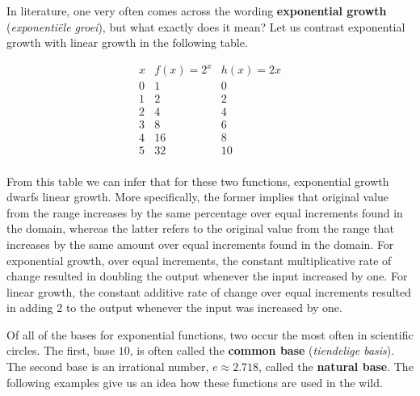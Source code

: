 In literature, one very often comes across the wording \textbf{exponential growth} (\textit{exponenti\"ele groei}), but what exactly does it mean? Let us contrast exponential growth with linear growth in the following table. 

\renewcommand{\arraystretch}{1.5}
\[ \begin{array}{r|r|r}  
 x & f(x)=2^x & h(x)=2x \\ \hline\hline
0  &  1 & 0 \\  
1  &  2 & 2 \\  
2  & 4 & 4 \\  
3  &  8 & 6 \\  
4  & 16 & 8 \\  
5  &  32 & 10 \\  
\end{array} \]
\renewcommand{\arraystretch}{1}

From this table we can infer that for these two functions, exponential growth dwarfs linear growth. More specifically, the former implies that original value from the range increases by the same percentage over equal increments found in the domain, whereas the latter refers to the original value from the range that increases by the same amount over equal increments found in the domain.
For exponential growth, over equal increments, the constant multiplicative rate of change resulted in doubling the output whenever the input increased by one. For linear growth, the constant additive rate of change over equal increments resulted in adding 2 to the output whenever the input was increased by one.

Of all of the bases for exponential functions, two occur the most often in scientific circles.  The first, base $10$, is often called the \textbf{common base} (\textit{tiendelige basis}).  The second base is an irrational number, $e \approx 2.718$, called the \textbf{natural base}.  The following examples give us an idea how these functions are used in the wild.


